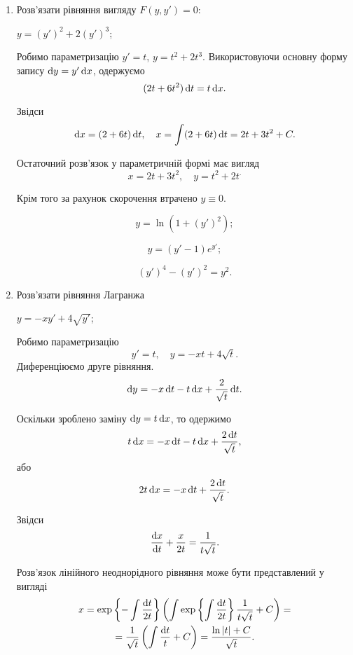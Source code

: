 \begin{enumerate}
	\item Розв'язати рівняння вигляду $F(y, y') = 0$:
	\begin{example}
		$y = (y')^2 + 2 (y')^3$;
	\end{example}

	\begin{solution}
		Робимо параметризацію $y' = t$, $y = t^2 + 2t^3$. Використовуючи основну форму запису $\mathop{}\!\mathrm{d} y = y' \mathop{}\!\mathrm{d} x$, одержуємо
		\[ (2t + 6t^2) \mathop{}\!\mathrm{d} t = t \mathop{}\!\mathrm{d} x.\]

		Звідси \[ \mathop{}\!\mathrm{d} x = (2 + 6t) \mathop{}\!\mathrm{d} t, \quad x = \int(2+6t) \mathop{}\!\mathrm{d} t = 2t + 3t^2 + C.\]

		Остаточний розв'язок у параметричній формі має вигляд 
		\[ x = 2t + 3t^2, \quad y = t^2 + 2t^.\]

		Крім того за рахунок скорочення втрачено $y \equiv 0$.
	\end{solution}
	
	\begin{multicols}{2}
		\begin{problem}
			\[ y = \ln ( 1 + (y')^2); \]
		\end{problem}
		
		\begin{problem}
			\[ y = (y' - 1) e^{y'}; \]
		\end{problem}
		
		\begin{problem}
		 	\[ (y')^4 - (y')^2 = y^2. \]
		\end{problem}
	\end{multicols}

	\item Розв'язати рівняння Лагранжа
	\begin{example}
		$y = - x y' + 4 \sqrt{y'}$;
	\end{example}

	\begin{solution}
		Робимо параметризацію \[ y' = t, \quad y = - xt + 4 \sqrt{t}.\] Диференціюємо друге рівняння.
		\[ \mathop{}\!\mathrm{d} y = - x \mathop{}\!\mathrm{d} t - t \mathop{}\!\mathrm{d} x + \frac{2}{\sqrt{t}} \mathop{}\!\mathrm{d} t.\]

		Оскільки зроблено заміну $\mathop{}\!\mathrm{d} y = t \mathop{}\!\mathrm{d} x$, то одержимо \[ t \mathop{}\!\mathrm{d} x = - x \mathop{}\!\mathrm{d} t - t \mathop{}\!\mathrm{d} x + \frac{2\mathop{}\!\mathrm{d} t}{\sqrt{t}},\] або \[ 2 t \mathop{}\!\mathrm{d} x = - x \mathop{}\!\mathrm{d} t + \frac{2 \mathop{}\!\mathrm{d} t}{\sqrt{t}}.\]

		Звідси \[ \frac{\mathop{}\!\mathrm{d} x}{\mathop{}\!\mathrm{d} t} + \frac{x}{2t} = \frac{1}{t \sqrt{t}}.\]

		Розв'язок лінійного неоднорідного рівняння може бути представлений у вигляді
		\begin{multline*}
			x = \exp\left\{ - \int \frac{\mathop{}\!\mathrm{d} t}{2t} \right\} \left( \int \exp\left\{\int \frac{\mathop{}\!\mathrm{d} t}{2t} \right\} \frac{1}{t\sqrt{t}} + C\right) = \\
			= \frac{1}{\sqrt{t}} \left(\int \frac {\mathop{}\!\mathrm{d} t}{t} + C\right) = \frac{\ln |t| + C}{\sqrt{t}}.
		\end{multline*}


\end{solution}
\end{enumerate}
